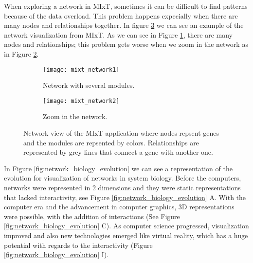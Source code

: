 When exploring a network in MIxT, sometimes it can be difficult to find patterns because of the data overload. This problem happens expecially when there are many nodes and relationships together. In figure \ref{fig:mixt_network} we can see an example of the network visualization from MIxT. As we can see in Figure \ref{fig:mixt_network1}, there are many nodes and relationships; this problem gets worse when we zoom in the network as in Figure \ref{fig:mixt_network_zoom}.

\begin{figure}[h!]
    \centering%
    \begin{subfigure}[t]{0.5\textwidth}
        \centering%
        \texttt{[image: mixt\_network1]}
        \caption{Network with several modules.}
        \label{fig:mixt_network1}
    \end{subfigure}%
    \begin{subfigure}[t]{0.5\textwidth}
        \centering%
        \texttt{[image: mixt\_network2]}
        \caption{Zoom in the network.}
        \label{fig:mixt_network_zoom}
    \end{subfigure}

    \caption{Network view of the MIxT application where nodes repsent genes and the modules are repsented by colors. Relationships are represented by grey lines that connect a gene with another one.}
    \label{fig:mixt_network}
\end{figure}

In Figure \ref{fig:network_biology_evolution} we can see a representation of the evolution for visualization of networks in system biology. Before the computers, networks were represented in 2 dimensions and they were static representations that lacked interactivity, see Figure \ref{fig:network_biology_evolution} A. With the computer era and the advancement in computer graphics, 3D representations were possible, with the addition of interactions (See Figure  \ref{fig:network_biology_evolution} C). As computer science progressed, visualization improved and also new technologies emerged like virtual reality, which has a huge potential with regards to the interactivity (Figure \ref{fig:network_biology_evolution} I).

